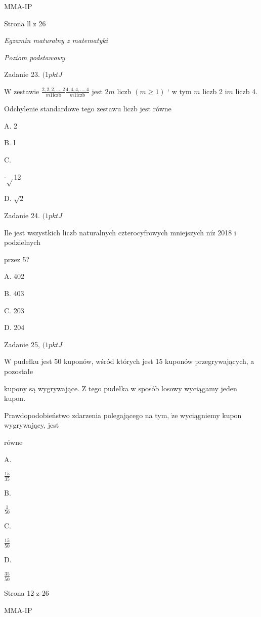 \documentclass[a4paper,12pt]{article}
\begin{document}
MMA-IP

Strona ll z 26





{\it Egzamin maturalny z matematyki}

{\it Poziom podstawowy}

Zadanie 23. $(1pktJ$

$\mathrm{W}$ zestawie $\displaystyle \frac{2,2,2,\ldots,2}{m1\mathrm{i}\mathrm{c}\mathrm{z}\mathrm{b}}\frac{4,4,4,\ldots,4}{m1\mathrm{i}\mathrm{c}\mathrm{z}\mathrm{b}}$ jest $2m$ liczb $(m\geq 1)$ ` w tym $m$ liczb 2 $\mathrm{i} m$ liczb 4.

Odchylenie standardowe tego zestawu liczb jest równe

A. 2

B. l

C.

-$\sqrt{}$12

D. $\sqrt{2}$

Zadanie 24. $(1pktJ$

Ile jest wszystkich liczb naturalnych czterocyfrowych mniejszych $\mathrm{n}\mathrm{i}\dot{\mathrm{z}}$ 2018 i podzielnych

przez 5?

A. 402

B. 403

C. 203

D. 204

Zadanie 25, $(1pktJ$

$\mathrm{W}$ pudełku jest 50 kuponów, wśród których jest 15 kuponów przegrywających, a pozostałe

kupony są wygrywające. $\mathrm{Z}$ tego pudełka w sposób losowy wyciągamy jeden kupon.

Prawdopodobieństwo zdarzenia polegającego na tym, $\dot{\mathrm{z}}\mathrm{e}$ wyciągniemy kupon wygrywający, jest

równe

A.

$\displaystyle \frac{15}{35}$

B.

$\displaystyle \frac{1}{50}$

C.

$\displaystyle \frac{15}{50}$

D.

$\displaystyle \frac{35}{50}$

Strona 12 z 26

MMA-IP
\end{document}
